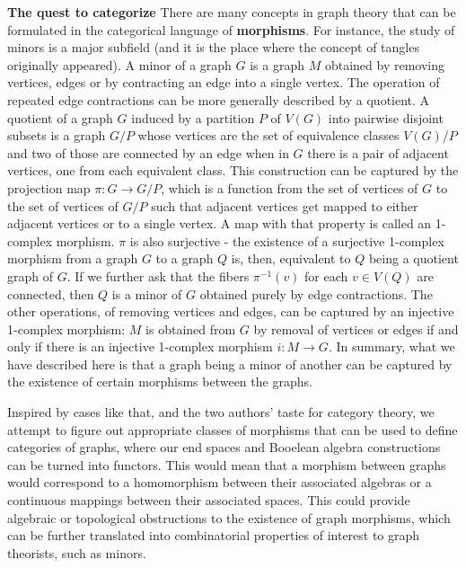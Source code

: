\documentclass[11pt,a4paper]{article}
\begin{document}
\textbf{\large The quest to categorize}
There are many concepts in graph theory that can be formulated in the categorical language of \textbf{morphisms}. For instance, the study of minors is a major subfield (and it is the place where the concept of tangles originally appeared). A minor of a graph $G$ is a graph $M$ obtained by removing vertices, edges or by contracting an edge into a single vertex. The operation of repeated edge contractions can be more generally described by a quotient. A quotient of a graph $G$ induced by a partition $P$ of $V(G)$ into pairwise disjoint subsets is a graph $G / P$ whose vertices are the set of equivalence classes $V(G) / P$ and two of those are connected by an edge when in $G$ there is a pair of adjacent vertices, one from each equivalent class. This construction can be captured by the projection map $\pi:G \to G/P$, which is a function from the set of vertices of $G$ to the set of vertices of $G / P$ such that adjacent vertices get mapped to either adjacent vertices or to a single vertex. A map with that property is called an 1-complex morphism. $\pi$ is also surjective - the existence of a surjective 1-complex morphism from a graph $G$ to a graph $Q$ is, then, equivalent to $Q$ being a quotient graph of $G$. If we further ask that the fibers $\pi^{-1}(v)$ for each $v \in V(Q)$ are connected, then $Q$ is a minor of $G$ obtained purely by edge contractions. The other operations, of removing vertices and edges, can be captured by an injective 1-complex morphism: $M$ is obtained from $G$ by removal of vertices or edges if and only if there is an injective 1-complex morphism $i: M \rightarrow G$. In summary, what we have described here is that a graph being a minor of another can be captured by the existence of certain morphisms between the graphs.

Inspired by cases like that, and the two authors' taste for category theory, we attempt to figure out appropriate classes of morphisms that can be used to define categories of graphs, where our end spaces and Booelean algebra constructions can be turned into functors. This would mean that a morphism between graphs would correspond to a homomorphism between their associated algebras or a continuous mappings between their associated spaces. This could provide algebraic or topological obstructions to the existence of graph morphisms, which can be further translated into combinatorial properties of interest to graph theorists, such as minors.
\end{document}
